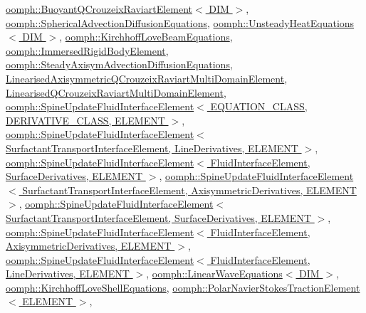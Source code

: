 \hyperlink{classoomph_1_1BuoyantQCrouzeixRaviartElement_a7bd9313dd697c1219cee4a65692388b5}{oomph\+::\+Buoyant\+Q\+Crouzeix\+Raviart\+Element$<$ D\+I\+M $>$}, \hyperlink{classoomph_1_1SphericalAdvectionDiffusionEquations_a9ed67207accc327c4d2bf614c4c452e0}{oomph\+::\+Spherical\+Advection\+Diffusion\+Equations}, \hyperlink{classoomph_1_1UnsteadyHeatEquations_a17f787d9bb9e6de030b28d2d12f41fd4}{oomph\+::\+Unsteady\+Heat\+Equations$<$ D\+I\+M $>$}, \hyperlink{classoomph_1_1KirchhoffLoveBeamEquations_af335ab12a9b5e870f25516a53b2a7b60}{oomph\+::\+Kirchhoff\+Love\+Beam\+Equations}, \hyperlink{classoomph_1_1ImmersedRigidBodyElement_ac3a062f70718c9bf85a470c2eca2c60f}{oomph\+::\+Immersed\+Rigid\+Body\+Element}, \hyperlink{classoomph_1_1SteadyAxisymAdvectionDiffusionEquations_afb560268691d5b469b8998a6dfe758b8}{oomph\+::\+Steady\+Axisym\+Advection\+Diffusion\+Equations}, \hyperlink{classLinearisedAxisymmetricQCrouzeixRaviartMultiDomainElement_a3920198ff369a194c7d0ca4628af1a8c}{Linearised\+Axisymmetric\+Q\+Crouzeix\+Raviart\+Multi\+Domain\+Element}, \hyperlink{classLinearisedQCrouzeixRaviartMultiDomainElement_a7798d37a41ab3e965da4142b1731a9e4}{Linearised\+Q\+Crouzeix\+Raviart\+Multi\+Domain\+Element}, \hyperlink{classoomph_1_1SpineUpdateFluidInterfaceElement_a457ca93343689e34535054cf829a9499}{oomph\+::\+Spine\+Update\+Fluid\+Interface\+Element$<$ E\+Q\+U\+A\+T\+I\+O\+N\+\_\+\+C\+L\+A\+S\+S, D\+E\+R\+I\+V\+A\+T\+I\+V\+E\+\_\+\+C\+L\+A\+S\+S, E\+L\+E\+M\+E\+N\+T $>$}, \hyperlink{classoomph_1_1SpineUpdateFluidInterfaceElement_a457ca93343689e34535054cf829a9499}{oomph\+::\+Spine\+Update\+Fluid\+Interface\+Element$<$ Surfactant\+Transport\+Interface\+Element, Line\+Derivatives, E\+L\+E\+M\+E\+N\+T $>$}, \hyperlink{classoomph_1_1SpineUpdateFluidInterfaceElement_a457ca93343689e34535054cf829a9499}{oomph\+::\+Spine\+Update\+Fluid\+Interface\+Element$<$ Fluid\+Interface\+Element, Surface\+Derivatives, E\+L\+E\+M\+E\+N\+T $>$}, \hyperlink{classoomph_1_1SpineUpdateFluidInterfaceElement_a457ca93343689e34535054cf829a9499}{oomph\+::\+Spine\+Update\+Fluid\+Interface\+Element$<$ Surfactant\+Transport\+Interface\+Element, Axisymmetric\+Derivatives, E\+L\+E\+M\+E\+N\+T $>$}, \hyperlink{classoomph_1_1SpineUpdateFluidInterfaceElement_a457ca93343689e34535054cf829a9499}{oomph\+::\+Spine\+Update\+Fluid\+Interface\+Element$<$ Surfactant\+Transport\+Interface\+Element, Surface\+Derivatives, E\+L\+E\+M\+E\+N\+T $>$}, \hyperlink{classoomph_1_1SpineUpdateFluidInterfaceElement_a457ca93343689e34535054cf829a9499}{oomph\+::\+Spine\+Update\+Fluid\+Interface\+Element$<$ Fluid\+Interface\+Element, Axisymmetric\+Derivatives, E\+L\+E\+M\+E\+N\+T $>$}, \hyperlink{classoomph_1_1SpineUpdateFluidInterfaceElement_a457ca93343689e34535054cf829a9499}{oomph\+::\+Spine\+Update\+Fluid\+Interface\+Element$<$ Fluid\+Interface\+Element, Line\+Derivatives, E\+L\+E\+M\+E\+N\+T $>$}, \hyperlink{classoomph_1_1LinearWaveEquations_a40f640d6f90bc3c4adb88d4aba3effce}{oomph\+::\+Linear\+Wave\+Equations$<$ D\+I\+M $>$}, \hyperlink{classoomph_1_1KirchhoffLoveShellEquations_a2c8049fa371d484a43e157ebef54b474}{oomph\+::\+Kirchhoff\+Love\+Shell\+Equations}, \hyperlink{classoomph_1_1PolarNavierStokesTractionElement_a4a8aea8b8278cb407348de86309e5074}{oomph\+::\+Polar\+Navier\+Stokes\+Traction\+Element$<$ E\+L\+E\+M\+E\+N\+T $>$}, 